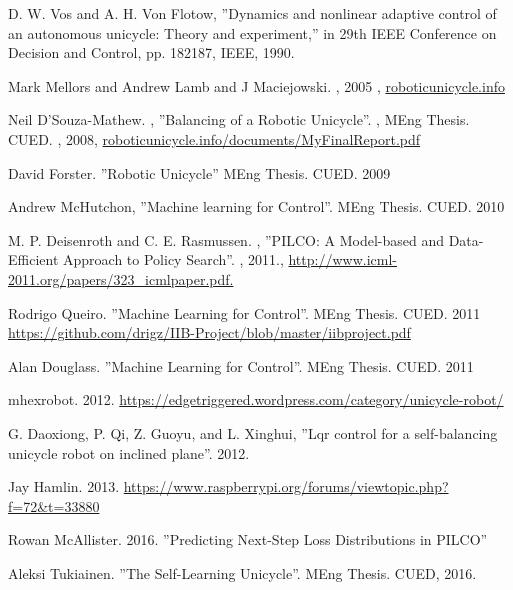 \documentclass[twoside,twocolumn,12pt]{article}
\begin{document}
\clearpage


\begin{thebibliography}{56}
D. W. Vos and A. H. Von Flotow, ''Dynamics and nonlinear adaptive control of an
autonomous unicycle: Theory and experiment,'' in 29th IEEE Conference on Decision
and Control, pp. 182{187, IEEE, 1990.}

Mark Mellors and Andrew Lamb and J Maciejowski. ,
 2005 ,
 \url{roboticunicycle.info} 
 
Neil D'Souza-Mathew. ,
 ''Balancing of a Robotic Unicycle''. ,
 MEng Thesis. CUED. ,
 2008,
  \url{roboticunicycle.info/documents/MyFinalReport.pdf}


David Forster. ''Robotic Unicycle'' MEng Thesis. CUED. 2009

Andrew McHutchon, ''Machine learning for Control''. MEng Thesis. CUED. 2010

M. P. Deisenroth and C. E. Rasmussen. , ''PILCO: A Model-based and Data-Efficient Approach to Policy Search''. ,
2011.,
 \url{http://www.icml-2011.org/papers/323_icmlpaper.pdf.}


Rodrigo Queiro. ''Machine Learning for Control''. MEng Thesis. CUED. 2011
\url{https://github.com/drigz/IIB-Project/blob/master/iibproject.pdf}

Alan Douglass. ''Machine Learning for Control''. MEng Thesis. CUED. 2011

mhexrobot. 2012. \url{https://edgetriggered.wordpress.com/category/unicycle-robot/}

G. Daoxiong, P. Qi, Z. Guoyu, and L. Xinghui, ''Lqr control for a self-balancing unicycle
robot on inclined plane''. 2012.

Jay Hamlin. 2013. \url{https://www.raspberrypi.org/forums/viewtopic.php?f=72&t=33880}
 
Rowan McAllister. 2016. ''Predicting Next-Step Loss Distributions in PILCO''

Aleksi Tukiainen. ''The Self-Learning Unicycle''. MEng Thesis. CUED, 2016.


\end{thebibliography}
\end{document}
